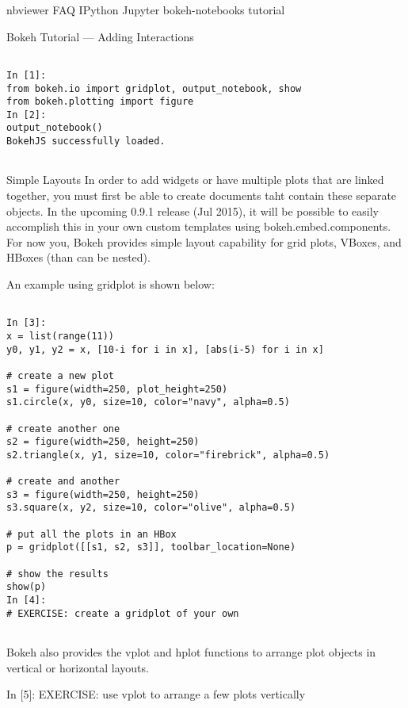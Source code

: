 \documentclass[a4paper,12pt]{article}
\begin{document}
	\large
nbviewer
FAQ
IPython
Jupyter
bokeh-notebooks   tutorial
 	
Bokeh Tutorial — Adding Interactions
\begin{framed}
\begin{verbatim}

In [1]:
from bokeh.io import gridplot, output_notebook, show
from bokeh.plotting import figure
In [2]:
output_notebook()
BokehJS successfully loaded.
	
\end{verbatim}
\end{framed}


Simple Layouts
In order to add widgets or have multiple plots that are linked together, you must first be able to create documents taht contain these separate objects. In the upcoming 0.9.1 release (Jul 2015), it will be possible to easily accomplish this in your own custom templates using bokeh.embed.components. For now you, Bokeh provides simple layout capability for grid plots, VBoxes, and HBoxes (than can be nested).

An example using gridplot is shown below:
\begin{framed}
	\begin{verbatim}
	
In [3]:
x = list(range(11))
y0, y1, y2 = x, [10-i for i in x], [abs(i-5) for i in x]

# create a new plot
s1 = figure(width=250, plot_height=250)
s1.circle(x, y0, size=10, color="navy", alpha=0.5)

# create another one
s2 = figure(width=250, height=250)
s2.triangle(x, y1, size=10, color="firebrick", alpha=0.5)

# create and another
s3 = figure(width=250, height=250)
s3.square(x, y2, size=10, color="olive", alpha=0.5)

# put all the plots in an HBox
p = gridplot([[s1, s2, s3]], toolbar_location=None)

# show the results
show(p)
In [4]:
# EXERCISE: create a gridplot of your own
	
\end{verbatim}
\end{framed}

Bokeh also provides the vplot and hplot functions to arrange plot objects in vertical or horizontal layouts.

In [5]:
EXERCISE: use vplot to arrange a few plots vertically
\end{document}
